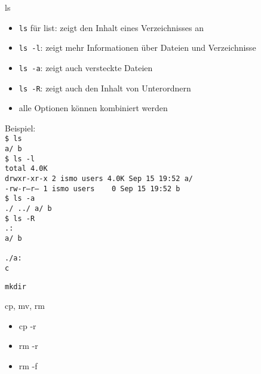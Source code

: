       \begin{frame}{ls}
        \begin{itemize}
          \item \texttt{ls} für list: zeigt den Inhalt eines Verzeichnisses an
          \item \texttt{ls -l}: zeigt mehr Informationen über Dateien und Verzeichnisse
          \item \texttt{ls -a}: zeigt auch versteckte Dateien
          \item \texttt{ls -R}: zeigt auch den Inhalt von Unterordnern
          \item alle Optionen können kombiniert werden
        \end{itemize}
      \end{frame}

      \begin{frame}
        Beispiel:\\
        \texttt{\$ ls\\
                a/  b\\
                \$ ls -l\\
                total 4.0K\\
                drwxr-xr-x 2 ismo users 4.0K Sep 15 19:52 a/\\
                -rw-r--r-- 1 ismo users \ \ \ 0 Sep 15 19:52 b\\
                \$ ls -a\\
                ./  ../  a/  b\\
                \$ ls -R\\
                .:\\
                a/  b\\
                ~\\
                ./a:\\
                c}
      \end{frame}

      \begin{frame}{\texttt{mkdir}}
      \end{frame}

      \begin{frame}{cp, mv, rm}
        \begin{itemize}
          \item cp -r\\
          \item rm -r\\
          \item rm -f
        \end{itemize}
      \end{frame}

